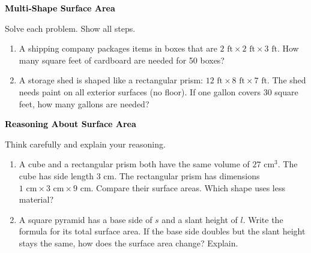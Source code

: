 \documentclass[12pt, letterpaper, fleqn]{article}
\begin{document}
\newpage

\begin{tcolorbox}[colback=black!10]
\large\textcolor{black}{\textbf{Multi-Shape Surface Area}}
\end{tcolorbox}

\noindent
Solve each problem. Show all steps.

\vspace{3mm}

\begin{enumerate}[itemsep=2cm, leftmargin=0.6cm]

\item A shipping company packages items in boxes that are $2\text{ ft} \times 2\text{ ft} \times 3\text{ ft}$. How many square feet of cardboard are needed for 50 boxes?

\vspace{2.2cm}

\item A storage shed is shaped like a rectangular prism: $12\text{ ft} \times 8\text{ ft} \times 7\text{ ft}$. The shed needs paint on all exterior surfaces (no floor). If one gallon covers 30 square feet, how many gallons are needed?

\vspace{2.5cm}

\end{enumerate}

\newpage

\begin{tcolorbox}[colback=black!10]
\large\textcolor{black}{\textbf{Reasoning About Surface Area}}
\end{tcolorbox}

\noindent
Think carefully and explain your reasoning.

\vspace{3mm}

\begin{enumerate}[itemsep=2.3cm, leftmargin=0.6cm]

\item A cube and a rectangular prism both have the same volume of $27\text{ cm}^3$. The cube has side length 3 cm. The rectangular prism has dimensions $1\text{ cm} \times 3\text{ cm} \times 9\text{ cm}$. Compare their surface areas. Which shape uses less material?

\vspace{5cm}

\item A square pyramid has a base side of $s$ and a slant height of $l$. Write the formula for its total surface area. If the base side doubles but the slant height stays the same, how does the surface area change? Explain.

\vspace{2.5cm}

\end{enumerate}
\end{document}
